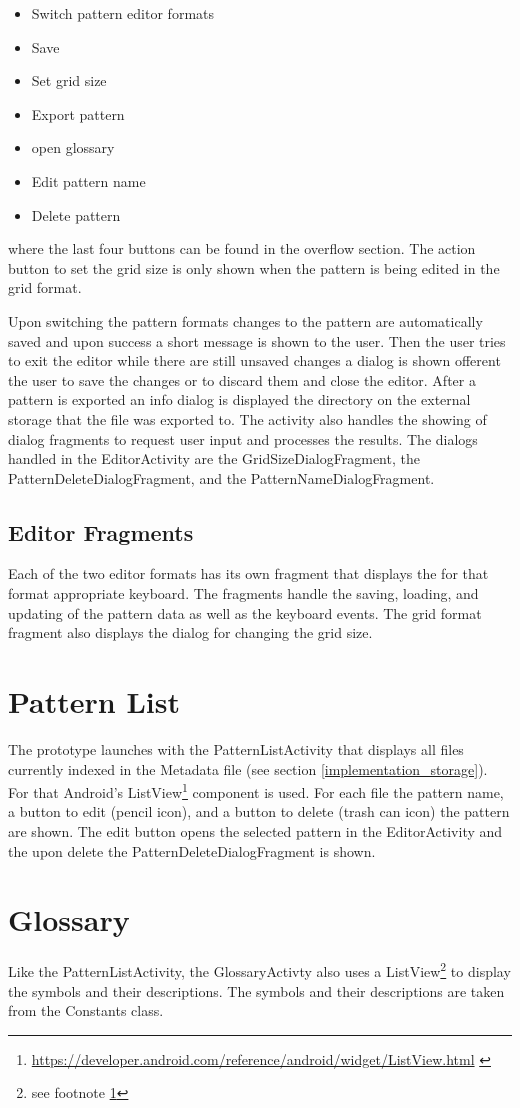 \begin{itemize}
\item Switch pattern editor formats
\item Save
\item Set grid size
\item Export pattern
\item open glossary
\item Edit pattern name
\item Delete pattern
\end{itemize}

where the last four buttons can be found in the overflow section. The action button to set the grid size is only shown when the pattern is being edited in the grid format.

Upon switching the pattern formats changes to the pattern are automatically saved and upon success a short message is shown to the user. Then the user tries to exit the editor while there are still unsaved changes a dialog is shown offerent the user to save the changes or to discard them and close the editor. After a pattern is exported an info dialog is displayed the directory on the external storage that the file was exported to.
The activity also handles the showing of dialog fragments to request user input and processes the results. The dialogs handled in the EditorActivity are the GridSizeDialogFragment, the PatternDeleteDialogFragment, and the PatternNameDialogFragment.

\subsection*{Editor Fragments}
Each of the two editor formats has its own fragment that displays the for that format appropriate keyboard. The fragments handle the saving, loading, and updating of the pattern data as well as the keyboard events. The grid format fragment also displays the dialog for changing the grid size.

\section{Pattern List}
The prototype launches with the PatternListActivity that displays all files currently indexed in the Metadata file (see section \ref{implementation_storage}). For that Android's ListView\footnote{\url{https://developer.android.com/reference/android/widget/ListView.html} \label{url_footnote}} component is used. For each file the pattern name, a button to edit (pencil icon), and a button to delete (trash can icon) the pattern are shown. The edit button opens the selected pattern in the EditorActivity and the upon delete the PatternDeleteDialogFragment is shown.

\section{Glossary}
Like the PatternListActivity, the GlossaryActivty also uses a ListView\footnote{see footnote \ref{url_footnote}} to display the symbols and their descriptions. The symbols and their descriptions are taken from the Constants class.